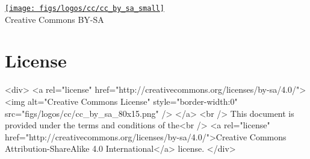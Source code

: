 \ifpdf

    \vfill %
    \begin{center}
        \href{http://creativecommons.org/licenses/by-sa/4.0/}{\texttt{[image: figs/logos/cc/cc\_by\_sa\_small]}}\\
        \small{Creative Commons BY-SA}
    \end{center}

\else

    \section*{License}\label{sec:license}

    \begin{rawhtml}

        <div>
            <a rel="license" href="http://creativecommons.org/licenses/by-sa/4.0/">
                <img alt="Creative Commons License" style="border-width:0" src="figs/logos/cc/cc_by_sa_80x15.png" />
            </a>
            <br />
            This document is provided under the terms and conditions of the<br />
            <a rel="license" href="http://creativecommons.org/licenses/by-sa/4.0/">Creative Commons Attribution-ShareAlike 4.0 International</a>
            license.
        </div>

    \end{rawhtml}

\fi
